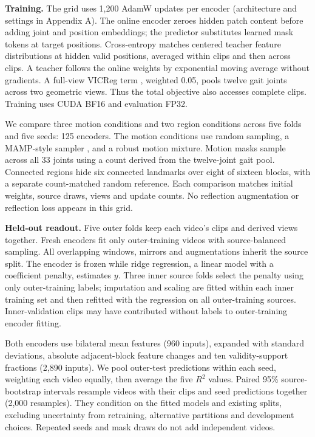 \documentclass{article}
\begin{document}
\textbf{Training.} The grid uses 1,200 AdamW updates per encoder
(architecture and settings in Appendix A). The online encoder zeroes
hidden patch content before adding joint and position embeddings; the
predictor substitutes learned mask tokens at target positions.
Cross-entropy matches centered teacher feature distributions at hidden
valid positions, averaged within clips and then across clips. A teacher
follows the online weights by exponential moving average without
gradients. A full-view VICReg term \citep{vicreg}, weighted 0.05, pools
twelve gait joints across two geometric views. Thus the total objective
also accesses complete clips. Training uses CUDA BF16 and evaluation
FP32.

We compare three motion conditions and two region conditions across five
folds and five seeds: 125 encoders. The motion conditions use random
sampling, a MAMP-style sampler \citep{mamp}, and a robust motion
mixture. Motion masks sample across all 33 joints using a count derived
from the twelve-joint gait pool. Connected regions hide six connected
landmarks over eight of sixteen blocks, with a separate count-matched
random reference. Each comparison matches initial weights, source draws,
views and update counts. No reflection augmentation or reflection loss
appears in this grid.

\textbf{Held-out readout.} Five outer folds keep each video's clips and
derived views together. Fresh encoders fit only outer-training videos
with source-balanced sampling. All overlapping windows, mirrors and
augmentations inherit the source split. The encoder is frozen while
ridge regression, a linear model with a coefficient penalty, estimates
\(y\). Three inner source folds select the penalty using only
outer-training labels; imputation and scaling are fitted within each
inner training set and then refitted with the regression on all
outer-training sources. Inner-validation clips may have contributed
without labels to outer-training encoder fitting.

Both encoders use bilateral mean features (960 inputs), expanded with
standard deviations, absolute adjacent-block feature changes and ten
validity-support fractions (2,890 inputs). We pool outer-test
predictions within each seed, weighting each video equally, then average
the five \(R^2\) values. Paired 95\% source-bootstrap intervals resample
videos with their clips and seed predictions together (2,000 resamples).
They condition on the fitted models and existing splits, excluding
uncertainty from retraining, alternative partitions and development
choices. Repeated seeds and mask draws do not add independent videos.
\end{document}
